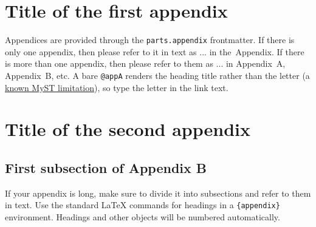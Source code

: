 \documentclass[qe,nameyear,final,openaccess]{econsocart}
\theoremstyle{plain}
\begin{document}
\begin{appendix}
\let\realsubsection\subsection
\let\realsubsubsection\subsubsection
\let\subsubsection\realsubsection
\let\subsection\section
\subsection{Title of the first appendix}\label{appA}

Appendices are provided through the \texttt{parts.appendix} frontmatter. If there is only one appendix, then please refer to it in text as ... in the~Appendix. If there is more than one appendix, then please refer to them as ... in Appendix~A, Appendix~B, etc. A bare \texttt{@appA} renders the heading title rather than the letter (a \href{https://github.com/executablebooks/mystmd/issues/1924}{known MyST limitation}), so type the letter in the link text.

\subsection{Title of the second appendix}\label{appB}

\subsubsection{First subsection of Appendix B}\label{appB1}

If your appendix is long, make sure to divide it into subsections and refer to them in text. Use the standard LaTeX commands for headings in a \texttt{\{appendix\}} environment. Headings and other objects will be numbered automatically.


\end{appendix}
\end{document}
